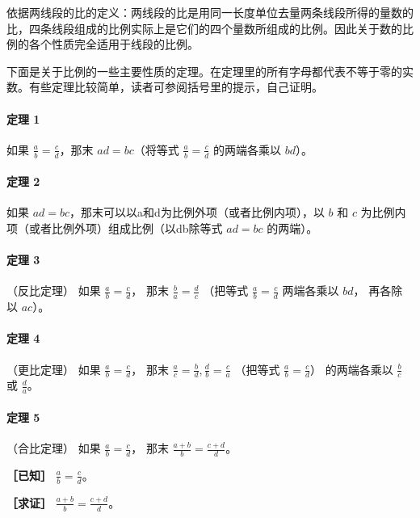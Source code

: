 依据两线段的比的定义：两线段的比是用同一长度单位去量两条线段所得的量数的比，四条线段组成的比例实际上是它们的四个量数所组成的比例。因此关于数的比例的各个性质完全适用于线段的比例。

下面是关于比例的一些主要性质的定理。在定理里的所有字母都代表不等于零的实数。有些定理比较简单，读者可参阅括号里的提示，自己证明。

\paragraph{定理 1}

如果 \(\frac{a}{b} = \frac{c}{d}\)，那末 \(ad = bc\)（将等式
\(\frac{a}{b} = \frac{c}{d}\) 的两端各乘以 \(bd\)）。

\paragraph{定理 2}

如果 \(ad = bc\)，那末可以以a和d为比例外项（或者比例内项），以 \(b\) 和
\(c\) 为比例内项（或者比例外项）组成比例（以db除等式 \(ad=bc\)
的两端）。

\paragraph{定理 3}

（反比定理） 如果 \(\frac{a}{b} = \frac{c}{d}\)， 那末
\(\frac{b}{a} = \frac{d}{c}\) （把等式 \(\frac{a}{b} = \frac{c}{d}\)
两端各乘以 \(bd\)， 再各除以 \(ac\)）。

\paragraph{定理 4}

（更比定理） 如果 \(\frac{a}{b} = \frac{c}{d}\)， 那末
\(\frac{a}{c} = \frac{b}{d}, \frac{d}{b} = \frac{c}{a}\) （把等式
\(\frac{a}{b} = \frac{c}{d}\)） 的两端各乘以 \(\frac{b}{c}\) 或
\(\frac{d}{a}\)。

\paragraph{定理 5}

（合比定理） 如果 \(\frac{a}{b} = \frac{c}{d}\)， 那末
\(\frac{a + b}{b} = \frac{c + d}{d}\)。

\textbf{［已知］} \(\frac{a}{b} = \frac{c}{d}\)。

\textbf{［求证］} \(\frac{a + b}{b} = \frac{c + d}{d}\)。

